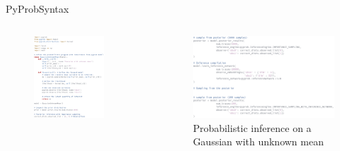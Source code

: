\documentclass[AERbeamer%
              ,optEnglish%
              ,optBiber%
              ,optBibstyleAlphabetic%
              ,optBeamerClassicFormat%
              ]{AERlatex}%
\begin{document}
\begin{frame}[c]{PyProb}{Syntax}
    \centering
    \begin{columns}[T]
        \begin{column}{0.48\textwidth}
            \centering
            \begin{figure}
                \centering
                \includegraphics[width=0.8\textwidth]{PyProbSyntax1.png}
            \end{figure}
        \end{column}
        \begin{column}{0.48\textwidth}
            \centering
            \begin{figure}
                \centering
                \includegraphics[width=\textwidth]{PyProbSyntax2.png}
                \caption{Probabilistic inference on a Gaussian with unknown mean}
            \end{figure}
        \end{column}
    \end{columns}
\end{frame}
\end{document}
